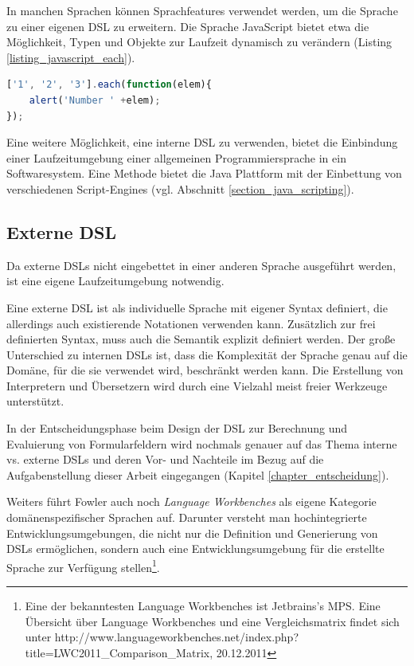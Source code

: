 In manchen Sprachen können Sprachfeatures verwendet werden, um die Sprache zu einer eigenen DSL zu erweitern. Die Sprache Java\-Script bietet etwa die Möglichkeit, Typen und Objekte zur Laufzeit dynamisch zu verändern (Listing \ref{listing_javascript_each}).

\begin{lstlisting}[language=JavaScript, caption={Erweiterung des Array-Typs um die Funktion \texttt{each()} in der Java\-Script Bibliothek Prototype},label=listing_javascript_each]
['1', '2', '3'].each(function(elem){
	alert('Number ' +elem);
});
\end{lstlisting}

Eine weitere Möglichkeit, eine interne DSL zu verwenden, bietet die Einbindung einer Laufzeitumgebung einer allgemeinen Programmiersprache in ein Softwaresystem. Eine Methode bietet die Java Plattform mit der Einbettung von verschiedenen Script-Engines (vgl. Abschnitt \ref{section_java_scripting}).

\subsection{Externe DSL} 

Da externe DSLs nicht eingebettet in einer anderen Sprache ausgeführt werden, ist eine eigene Laufzeitumgebung not\-wen\-dig. 

Eine externe DSL ist als individuelle Sprache mit eigener Syntax definiert, die allerdings auch existierende Notationen verwenden kann. Zu\-sätz\-lich zur frei definierten Syntax, muss auch die Semantik explizit definiert werden. Der große Unterschied zu internen DSLs ist, dass die Komplexität der Sprache genau auf die Domäne, für die sie verwendet wird, beschränkt werden kann. Die Erstellung von Interpretern und Übersetzern wird durch eine Vielzahl meist freier Werkzeuge unterstützt.

In der Entscheidungsphase beim Design der DSL zur Berechnung und Eva\-lu\-ier\-ung von Formularfeldern wird nochmals genauer 
auf das Thema interne vs. externe DSLs und deren Vor- und Nachteile im Bezug auf die Aufgabenstellung dieser 
Arbeit eingegangen (Kapitel \ref{chapter_entscheidung}).

Weiters führt Fowler auch noch \textit{Language Workbenches} als eigene Kategorie domänenspezifischer Sprachen auf. 
Darunter versteht man hochintegrierte Entwicklungsumgebungen, die nicht nur die Definition und Generierung von DSLs ermöglichen, 
sondern auch eine Entwicklungsumgebung für die erstellte Sprache zur Verfügung stellen\footnote{Eine der bekanntesten Language Workbenches ist Jetbrains's MPS. Eine Über\-sicht über Language Workbenches und eine 
Vergleichsmatrix findet sich unter http://www.languageworkbenches.net/index.php?title=LWC2011\_Comparison\_Matrix, 20.12.2011}.




